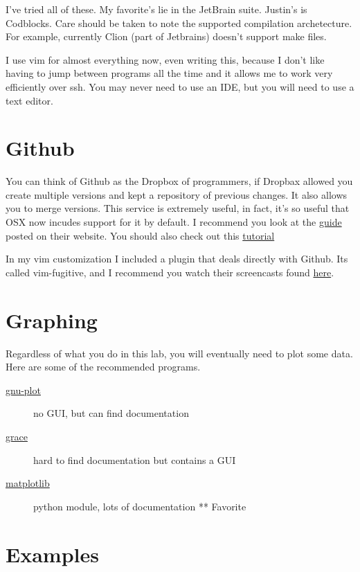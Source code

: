\documentclass{article}
\begin{document}
I've tried all of these. 
My favorite's lie in the JetBrain suite. 
Justin's is Codblocks. 
Care should be taken to note the supported compilation archetecture. 
For example, currently Clion (part of Jetbrains) doesn't support make files.

I use vim for almost everything now, even writing this, because I don't like having to jump between programs all the time and it allows me to work very efficiently over ssh.
You may never need to use an IDE, but you will need to use a text editor.

\section*{Github}
You can think of Github as the Dropbox of programmers, if Dropbax allowed you create multiple versions and kept a repository of previous changes.
It also allows you to merge versions.
This service is extremely useful, in fact, it's so useful that OSX now incudes support for it by default.
I recommend you look at the \href{https://help.github.com/categories/bootcamp/}{guide} posted on their website.
You should also check out this \href{https://www.atlassian.com/git/tutorials/}{tutorial}

In my vim customization I included a plugin that deals directly with Github.
Its called vim-fugitive, and I recommend you watch their screencasts found \href{https://github.com/tpope/vim-fugitive}{here}.


\section*{Graphing}

Regardless of what you do in this lab, you will eventually need to plot some data.
Here are some of the recommended programs.

\begin{description}
  \item[\href{http://alvinalexander.com/technology/gnuplot-charts-graphs-examples}{gnu-plot}] no GUI, but can find documentation
  \item[\href{http://www.phy.ohiou.edu/~elster/phys5071/extras/xmgrace\_tutorial.pdf}{grace}] hard to find documentation but contains a GUI
  \item[\href{http://matplotlib.org/}{matplotlib}] python module, lots of documentation ** Favorite
\end{description} 

\section*{Examples}
\end{document}
